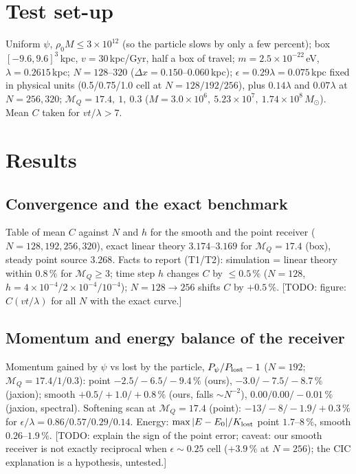 \documentclass[11pt]{article}
\newcommand{\todo}[1]{{\color{red}[TODO: #1]}}
\newcommand{\MQ}{\mathcal{M}_Q}
\begin{document}
\section{Test set-up}
Uniform $\psi$, $\rho_0 M\le 3\times10^{12}$ (so the particle slows by only a few percent); box $[-9.6,9.6]^3$\,kpc, $v=30$\,kpc/Gyr, half a box of travel; $m=2.5\times10^{-22}$\,eV, $\lambda=0.2615$\,kpc;
$N=128$--$320$ ($\Delta x=0.150$--$0.060$\,kpc); $\epsilon=0.29\lambda=0.075$\,kpc fixed in physical units (0.5/0.75/1.0 cell at $N=128/192/256$), plus $0.14\lambda$ and $0.07\lambda$ at $N=256,320$;
$\MQ=17.4,\ 1,\ 0.3$ ($M=3.0\times10^6,\ 5.23\times10^7,\ 1.74\times10^8\,M_\odot$). Mean $C$ taken for $vt/\lambda>7$.

\section{Results}
\subsection{Convergence and the exact benchmark}
Table of mean $C$ against $N$ and $h$ for the smooth and the point receiver ($N=128,192,256,320$), exact linear theory $3.174$--$3.169$ for $\MQ=17.4$ (box), steady point source $3.268$.
Facts to report (T1/T2): simulation = linear theory within $0.8\,\%$ for $\MQ\ge3$; time step $h$ changes $C$ by $\le0.5\,\%$ ($N=128$, $h=4\times10^{-4}/2\times10^{-4}/10^{-4}$);
$N=128\to256$ shifts $C$ by $+0.5\,\%$. \todo{figure: $C(vt/\lambda)$ for all $N$ with the exact curve.}
\subsection{Momentum and energy balance of the receiver}
Momentum gained by $\psi$ vs lost by the particle, $P_\psi/P_{\rm lost}-1$ ($N=192$; $\MQ=17.4/1/0.3$):
point $-2.5/-6.5/-9.4\,\%$ (ours), $-3.0/-7.5/-8.7\,\%$ (jaxion); smooth $+0.5/+1.0/+0.8\,\%$ (ours, falls $\sim N^{-2}$), $0.00/0.00/-0.01\,\%$ (jaxion, spectral).
Softening scan at $\MQ=17.4$ (point): $-13/-8/-1.9/+0.3\,\%$ for $\epsilon/\lambda=0.86/0.57/0.29/0.14$. Energy: $\max|E-E_0|/K_{\rm lost}$ point $1.7$--$8\,\%$, smooth $0.26$--$1.9\,\%$.
\todo{explain the sign of the point error; caveat: our smooth receiver is not exactly reciprocal when $\epsilon\sim0.25$ cell ($+3.9\,\%$ at $N=256$); the CIC explanation is a hypothesis, untested.}
\end{document}
